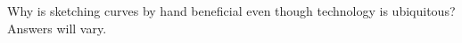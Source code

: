 {Why is sketching curves by hand beneficial even though technology is ubiquitous?
}
{Answers will vary.
}
